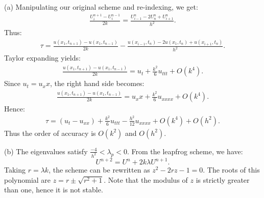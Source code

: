 \documentclass[9pt,oneside,openany]{memoir}
\begin{document}
\begin{solution}
    (a) Manipulating our original scheme and re-indexing, we get:
        \begin{equation*}
        \begin{split}
            \frac{U_i^{n+1} - U_i^{n-1}}{2k} = \frac{U_{i-1}^n - 2 U_n^n + U_{i+1}^n}{h^2}.
        \end{split}
        \end{equation*}
    Thus:
        \begin{equation*}
        \begin{split}
            \tau = \frac{u(x_1,t_{n+1}) - u(x_1,t_{n-1})}{2k} - \frac{u(x_{i-1},t_n) - 2u(x_1,t_n) + u(x_{i+1},t_n)}{h^2}.
        \end{split}
        \end{equation*}
    Taylor expanding yields:
        \begin{equation*}
        \begin{split}
            \frac{u(x_1,t_{n+1}) - u(x_1,t_{n-1})}{2k} = u_t + \frac{k^2}{6}u_{ttt} + O(k^4).
        \end{split}
        \end{equation*}
    Since $u_t = u_xx$, the right hand side becomes:
        \begin{equation*}
        \begin{split}
            \frac{u(x_1,t_{n+1}) - u(x_1,t_{n-1})}{2k} = u_xx + \frac{k^2}{6}u_{xxxx} + O(k^4).
        \end{split}
        \end{equation*}
    Hence:
        \begin{equation*}
        \begin{split}
            \tau = (u_t - u_{xx}) + \frac{k^2}{6}u_{ttt} - \frac{h^2}{12}u_{xxxx} + O(k^4) + O(h^2).
        \end{split}
        \end{equation*}
    Thus the order of accuracy is $O(k^2)$ and $O(h^2)$.

    (b) The eigenvalues satisfy $\frac{-4}{h^2} < \lambda_p < 0$. From the leapfrog scheme, we have: $$U^{n+2} = U^n + 2k\lambda U^{n+1}.$$ Taking $r = \lambda k$, the scheme can be rewritten as $z^2 -2rz - 1 = 0$. The roots of this polynomial are $z = r \pm \sqrt{r^2 + 1}$. Note that the modulus of $z$ is strictly greater than one, hence it is not stable.  
\end{solution}
    
\end{document}
